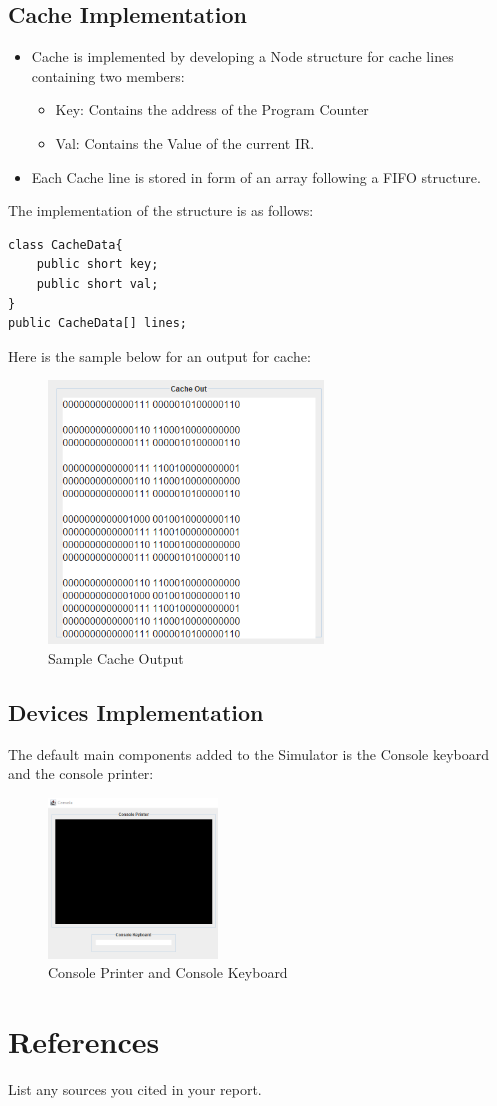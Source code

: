 \documentclass[10pt]{article}
\begin{document}
\subsection{Cache Implementation}
\begin{itemize}
  \item Cache is implemented by developing a Node structure for cache lines containing two
  members:
  \begin{itemize}[label=--]
    \item Key: Contains the address of the Program Counter
    \item Val: Contains the Value of the current IR.
  \end{itemize}
  \item Each Cache line is stored in form of an array following a FIFO structure.
\end{itemize}
The implementation of the structure is as follows:
\begin{lstlisting}[caption={Cache Struct Implementation Code}]
class CacheData{
    public short key;
    public short val;
}
public CacheData[] lines;
\end{lstlisting}
Here is the sample below for an output for cache:
\begin{figure}[H]
  \centering
  \includegraphics[width=0.65\textwidth]{Pics/Fig14.png}
  \caption{Sample Cache Output}
  \label{fig:Cache Output}
\end{figure}
\subsection{Devices Implementation}
The default main components added to the Simulator is the Console keyboard and the console printer:
\begin{figure}[H]
  \centering
  \includegraphics[width=0.4\textwidth]{Pics/Fig15.png}
  \caption{Console Printer and Console Keyboard}
  \label{fig:ConsolePrinterKeyboard}
\end{figure}
\section{References}
List any sources you cited in your report.
\end{document}
